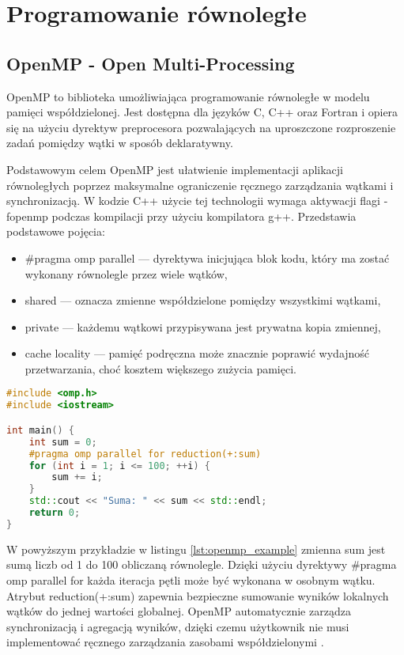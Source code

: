 \section{Programowanie równoległe}
\subsection{OpenMP -  Open Multi-Processing}
OpenMP to biblioteka umożliwiająca programowanie równoległe w modelu pamięci współdzielonej. Jest dostępna dla języków C, C++ oraz Fortran i opiera się na użyciu dyrektyw preprocesora pozwalających na uproszczone rozproszenie zadań pomiędzy wątki w sposób deklaratywny.

Podstawowym celem OpenMP jest ułatwienie implementacji aplikacji równoległych poprzez maksymalne ograniczenie ręcznego zarządzania wątkami i synchronizacją. W kodzie C++ użycie tej technologii wymaga aktywacji flagi -fopenmp podczas kompilacji przy użyciu kompilatora g++.
Przedstawia podstawowe pojęcia:
\begin{itemize}
    \item \#pragma omp parallel — dyrektywa inicjująca blok kodu, który ma zostać wykonany równolegle przez wiele wątków,
    \item shared — oznacza zmienne współdzielone pomiędzy wszystkimi wątkami,
    \item private — każdemu wątkowi przypisywana jest prywatna kopia zmiennej,
    \item cache locality — pamięć podręczna  może znacznie poprawić wydajność przetwarzania, choć kosztem większego zużycia pamięci.
\end{itemize}

\begin{lstlisting}[language=C++, caption={Przykład użycia OpenMP w C++}, label={lst:openmp_example}]
#include <omp.h>
#include <iostream>

int main() {
    int sum = 0;
    #pragma omp parallel for reduction(+:sum)
    for (int i = 1; i <= 100; ++i) {
        sum += i;
    }
    std::cout << "Suma: " << sum << std::endl;
    return 0;
}
\end{lstlisting}    
W powyższym przykładzie w listingu \ref{lst:openmp_example} zmienna sum jest sumą liczb od 1 do 100 obliczaną równolegle. Dzięki użyciu dyrektywy \#pragma omp parallel for każda iteracja pętli może być wykonana w osobnym wątku. Atrybut reduction(+:sum) zapewnia bezpieczne sumowanie wyników lokalnych wątków do jednej wartości globalnej. OpenMP automatycznie zarządza synchronizacją i agregacją wyników, dzięki czemu użytkownik nie musi implementować ręcznego zarządzania zasobami współdzielonymi
.

